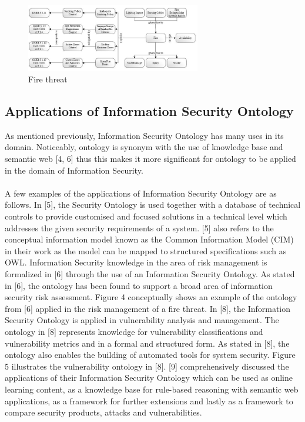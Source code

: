 \documentclass[conference, compsoc]{IEEEtran}
\begin{document}
\begin{figure}[!t]
\centering
\includegraphics[width=3.0in]{fire-threat}
\caption{Fire threat}
\label{fire-threat}
\end{figure}

\subsection{Applications of Information Security Ontology}
As mentioned previously, Information Security Ontology has many uses in its domain. Noticeably, ontology is synonym with the use of knowledge base and semantic web [4, 6] thus this makes it more significant for ontology to be applied in the domain of Information Security.
\\
\\
A few examples of the applications of Information Security Ontology are as follows. In [5], the Security Ontology is used together with a database of technical controls to provide customised and focused solutions in a technical level which addresses the given security requirements of a system. [5] also refers to the conceptual information model known as the Common Information Model (CIM) in their work as the model can be mapped to structured specifications such as OWL. Information Security knowledge in the area of risk management is formalized in [6] through the use of an Information Security Ontology. As stated in [6], the ontology has been found to support a broad area of information security risk assessment. Figure 4 conceptually shows an example of the ontology from [6] applied in the risk management of a fire threat. In [8], the Information Security Ontology is applied in vulnerability analysis and management. The ontology in [8] represents knowledge for vulnerability classifications and vulnerability metrics and in a formal and structured form. As stated in [8], the ontology also enables the building of automated tools for system security. Figure 5 illustrates the vulnerability ontology in [8]. [9] comprehensively discussed the applications of their Information Security Ontology which can be used as online learning content, as a knowledge base for rule-based reasoning with semantic web applications, as a framework for further extensions and lastly as a framework to compare security products, attacks and vulnerabilities.
\end{document}
